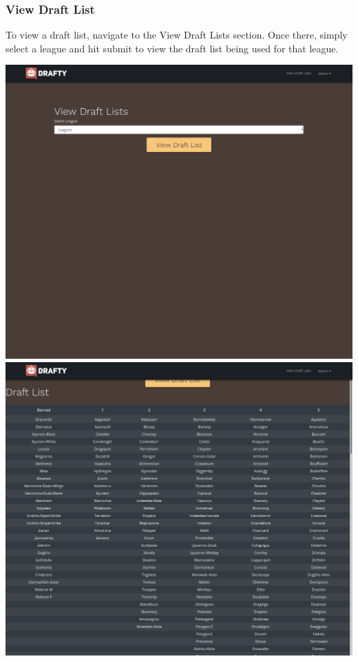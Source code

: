 \documentclass{article}
\begin{document}
  \subsubsection*{View Draft List}
  To view a draft list, navigate to the View Draft Lists section. Once there, simply select a league and hit submit to view the draft list being used for that league.\\
  \begin{center}
    \includegraphics[scale=.3]{view_dl.png}
    \includegraphics[scale=.3]{view_dl2.png}
  \end{center}
\end{document}
